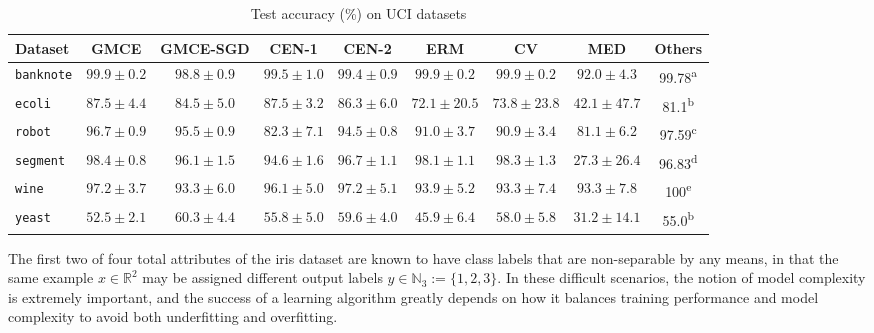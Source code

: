 \documentclass[twoside]{article}
\begin{document}
		\begin{table*}[t]
			\caption{Test accuracy (\%) on UCI datasets}
			\label{tab:uci_experiments}
			\centering
			\begin{tabular}{lcccccccc}	
				Dataset & G\gls{MCE} & G\gls{MCE}-SGD & \gls{CEN}-1 & \gls{CEN}-2 & ERM & CV & MED & Others \\
				\midrule
				\texttt{banknote} & $\mathbf{99.9 \pm 0.2}$ & $98.8 \pm 0.9$ & $99.5 \pm 1.0$ & $99.4 \pm 0.9$ & $\mathbf{99.9 \pm 0.2}$ & $\mathbf{99.9 \pm 0.2}$ & $92.0 \pm 4.3$ & 99.78\textsuperscript{a} \\
				\texttt{ecoli} & $\mathbf{87.5 \pm 4.4}$ & $84.5 \pm 5.0$ & $\mathbf{87.5 \pm 3.2}$ & $86.3 \pm 6.0$ & $72.1 \pm 20.5$ & $73.8 \pm 23.8$ & $42.1 \pm 47.7$ & 81.1\textsuperscript{b} \\
				\texttt{robot} & $\mathbf{96.7 \pm 0.9}$ & $95.5 \pm 0.9$ & $82.3 \pm 7.1$ & $94.5 \pm 0.8$ & $91.0 \pm 3.7$ & $90.9 \pm 3.4$ & $81.1 \pm 6.2$ & 97.59\textsuperscript{c} \\
				\texttt{segment} & $\mathbf{98.4 \pm 0.8}$ & $96.1 \pm 1.5$ & $94.6 \pm 1.6$ & $96.7 \pm 1.1$ & $98.1 \pm 1.1$ & $98.3 \pm 1.3$ & $27.3 \pm 26.4$ & 96.83\textsuperscript{d} \\
				\texttt{wine} & $\mathbf{97.2 \pm 3.7}$ & $93.3 \pm 6.0$ & $96.1 \pm 5.0$ & $97.2 \pm 5.1$ & $93.9 \pm 5.2$ & $93.3 \pm 7.4$ & $93.3 \pm 7.8$ & 100\textsuperscript{e} \\
				\texttt{yeast} & $52.5 \pm 2.1$ & $\mathbf{60.3 \pm 4.4}$ & $55.8 \pm 5.0$ & $59.6 \pm 4.0$ & $45.9 \pm 6.4$ & $58.0 \pm 5.8$ & $31.2 \pm 14.1$ & 55.0\textsuperscript{b} \\
			\end{tabular}
		\end{table*}
		
		The first two of four total attributes of the iris dataset \citep{fisher1936use} are known to have class labels that are non-separable by any means, in that the same example $x \in \mathbb{R}^{2}$ may be assigned different output labels $y \in \mathbb{N}_{3} := \{1, 2, 3\}$. In these difficult scenarios, the notion of model complexity is extremely important, and the success of a learning algorithm greatly depends on how it balances training performance and model complexity to avoid both underfitting and overfitting. 
		
\end{document}
